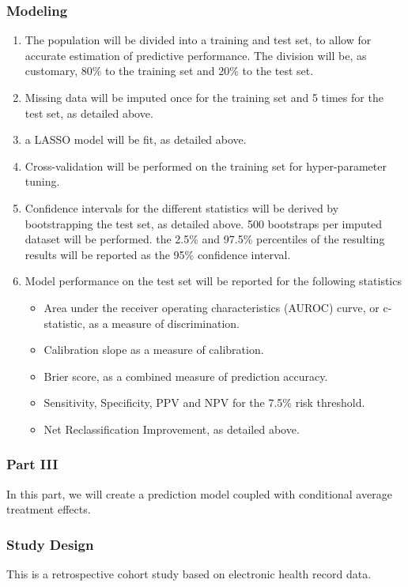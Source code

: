\documentclass[a4paper,12pt]{article}
\begin{document}
		\subsubsection*{Modeling}
		\begin{enumerate}
			\item The population will be divided into a training and test set, to allow for accurate estimation of predictive performance. The division will be, as customary, 80\% to the training set and 20\% to the test set.
			\item Missing data will be imputed once for the training set and 5 times for the test set, as detailed above.
			\item a LASSO model will be fit, as detailed above.
			\item Cross-validation will be performed on the training set for hyper-parameter tuning.
			\item Confidence intervals for the different statistics will be derived by bootstrapping the test set, as detailed above. 500 bootstraps per imputed dataset will be performed. the 2.5\% and 97.5\% percentiles of the resulting results will be reported as the 95\% confidence interval.
			\item Model performance on the test set will be reported for the following statistics \cite{Steyerberg2008,FrankE.Harrell2015}
			\begin{itemize}
				\item Area under the receiver operating characteristics (AUROC) curve, or c-statistic, as a measure of discrimination.
				\item Calibration slope as a measure of calibration.
				\item Brier score, as a combined measure of prediction accuracy.
				\item Sensitivity, Specificity, PPV and NPV for the 7.5\% risk threshold.
				\item Net Reclassification Improvement, as detailed above.
			\end{itemize}
		\end{enumerate}
		
		\subsubsection{Part III}
		In this part, we will create a prediction model coupled with conditional average treatment effects.
		
		\subsubsection*{Study Design}
		This is a retrospective cohort study based on electronic health record data.
		
\end{document}
